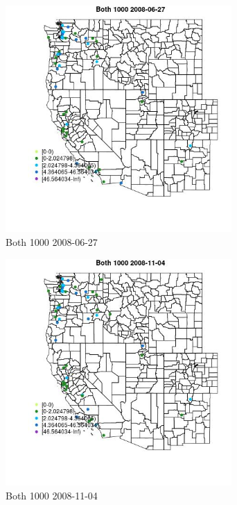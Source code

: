 \begin{figure} 
\centering  
\includegraphics[width=0.77\textwidth]{Code_Outputs/Report_ML_input_PM25_Step4_part_e_de_duplicated_aves_MapObsBoth_10002008-06-27.jpg} 
\caption{\label{fig:Report_ML_input_PM25_Step4_part_e_de_duplicated_avesMapObsBoth_10002008-06-27}Both 1000 2008-06-27} 
\end{figure} 
 

\begin{figure} 
\centering  
\includegraphics[width=0.77\textwidth]{Code_Outputs/Report_ML_input_PM25_Step4_part_e_de_duplicated_aves_MapObsBoth_10002008-11-04.jpg} 
\caption{\label{fig:Report_ML_input_PM25_Step4_part_e_de_duplicated_avesMapObsBoth_10002008-11-04}Both 1000 2008-11-04} 
\end{figure} 
 

